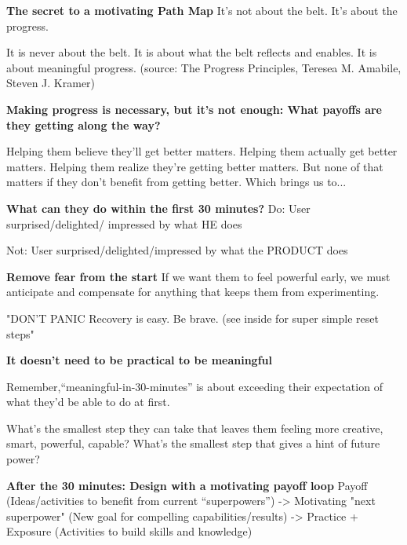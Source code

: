 \textbf{The secret to a motivating Path Map}
It’s not about the belt.
It’s about the progress.

It is never about the belt.
It is about what the belt reflects and enables. It is about meaningful progress.
(source: The Progress Principles, Teresea M. Amabile, Steven J. Kramer)


\textbf{Making progress is necessary, but it’s not enough: What payoffs are they getting along the way?}

Helping them believe they’ll get better matters. Helping them actually get better matters.
Helping them realize they’re getting better matters.
But none of that matters if they don’t benefit from getting better.
Which brings us to...

\textbf{What can they do within the first 30 minutes?}
Do: User surprised/delighted/ impressed by what HE does

Not: User surprised/delighted/impressed by what the PRODUCT does

\textbf{Remove fear from the start}
If we want them to feel powerful early, we must anticipate and compensate for anything that keeps them from experimenting.

"DON’T PANIC
Recovery is easy.
Be brave. (see inside for super simple reset steps"

\textbf{It doesn't need to be practical to be meaningful}

Remember,“meaningful-in-30-minutes” is about exceeding their expectation of what they’d be able to do at first.

What’s the smallest step they can take that leaves them feeling more creative, smart, powerful, capable?
What’s the smallest step that gives a hint of future power?

\textbf{After the 30 minutes: Design with a motivating payoff loop}
Payoff (Ideas/activities to benefit from current “superpowers”) ->
Motivating "next superpower" (New goal for compelling capabilities/results)
-> Practice + Exposure (Activities to build skills and knowledge)

